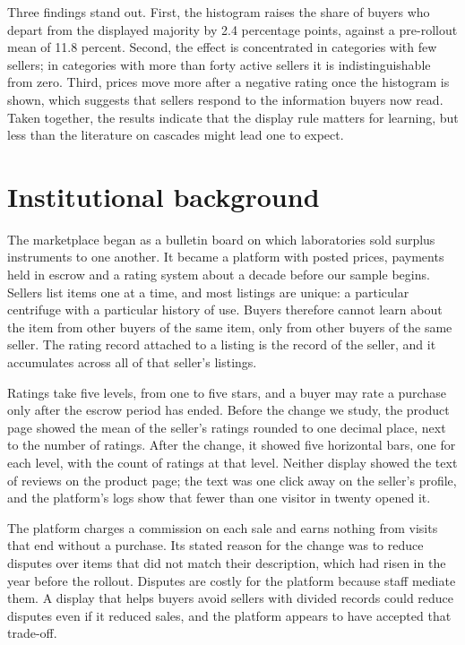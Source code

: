 \documentclass[12pt]{article}
\begin{document}
Three findings stand out. First, the histogram raises the share of buyers who depart from the displayed majority by 2.4 percentage points, against a pre-rollout mean of 11.8 percent. Second, the effect is concentrated in categories with few sellers; in categories with more than forty active sellers it is indistinguishable from zero. Third, prices move more after a negative rating once the histogram is shown, which suggests that sellers respond to the information buyers now read. Taken together, the results indicate that the display rule matters for learning, but less than the literature on cascades might lead one to expect.

\section{Institutional background}
The marketplace began as a bulletin board on which laboratories sold surplus instruments to one another. It became a platform with posted prices, payments held in escrow and a rating system about a decade before our sample begins. Sellers list items one at a time, and most listings are unique: a particular centrifuge with a particular history of use. Buyers therefore cannot learn about the item from other buyers of the same item, only from other buyers of the same seller. The rating record attached to a listing is the record of the seller, and it accumulates across all of that seller's listings.

Ratings take five levels, from one to five stars, and a buyer may rate a purchase only after the escrow period has ended. Before the change we study, the product page showed the mean of the seller's ratings rounded to one decimal place, next to the number of ratings. After the change, it showed five horizontal bars, one for each level, with the count of ratings at that level. Neither display showed the text of reviews on the product page; the text was one click away on the seller's profile, and the platform's logs show that fewer than one visitor in twenty opened it.

The platform charges a commission on each sale and earns nothing from visits that end without a purchase. Its stated reason for the change was to reduce disputes over items that did not match their description, which had risen in the year before the rollout. Disputes are costly for the platform because staff mediate them. A display that helps buyers avoid sellers with divided records could reduce disputes even if it reduced sales, and the platform appears to have accepted that trade-off.
\end{document}

